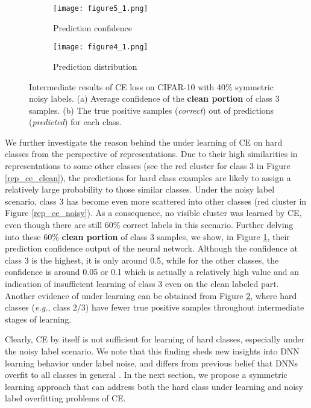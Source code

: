 \documentclass[10pt,twocolumn,letterpaper]{article}
\begin{document}
\begin{figure}[!t]
	\centering
	\begin{subfigure}{0.49\linewidth}
		\texttt{[image: figure5\_1.png]}
		\caption{Prediction confidence}
		\label{ce_confidence}
	\end{subfigure}
	\begin{subfigure}{0.49\linewidth} 
		\texttt{[image: figure4\_1.png]}
		\caption{Prediction distribution} 
		\label{pred_imbalance}
	\end{subfigure}
	\vspace{-0.1 in}
	\caption{Intermediate results of CE loss on CIFAR-10 with 40\% symmetric noisy labels. (a) Average confidence of the \textbf{clean portion} of class 3 samples. (b) The true positive samples (\emph{correct}) out of predictions (\emph{predicted}) for each class.}
	\label{inner_ce}
	\vspace{-0.15 in}
\end{figure}

We further investigate the reason behind the under learning of CE on hard classes from the perspective of representations. Due to their high similarities in representations to some other classes (see the red cluster for class 3 in Figure \ref{rep_ce_clean}), the predictions for hard class examples are likely to assign a relatively large probability to those similar classes. 
Under the noisy label scenario, class 3 has become even more scattered into other classes (red cluster in Figure \ref{rep_ce_noisy}). As a consequence, no visible cluster was learned by CE, even though there are still 60\% correct labels in this scenario. Further delving into these 60\% \textbf{clean portion} of class 3 samples, we show, in Figure \ref{ce_confidence}, their prediction confidence output of the neural network. Although the confidence at class 3 is the highest, it is only around 0.5, while for the other classes, the confidence is around 0.05 or 0.1 which is actually a relatively high value and an indication of insufficient learning of class 3 even on the clean labeled part.
Another evidence of under learning can be obtained from Figure \ref{pred_imbalance}, where hard classes (\textit{e.g.}, class $2/3$) have fewer true positive samples throughout intermediate stages of learning.

Clearly, CE by itself is not sufficient for learning of hard classes, especially under the noisy label scenario. We note that this finding sheds new insights into DNN learning behavior under label noise, and differs from previous belief that DNNs overfit to all classes in general \cite{arpit2017closer,zhang2016understanding}. In the next section, we propose a symmetric learning approach that can address both the hard class under learning and noisy label overfitting problems of CE.
\end{document}
